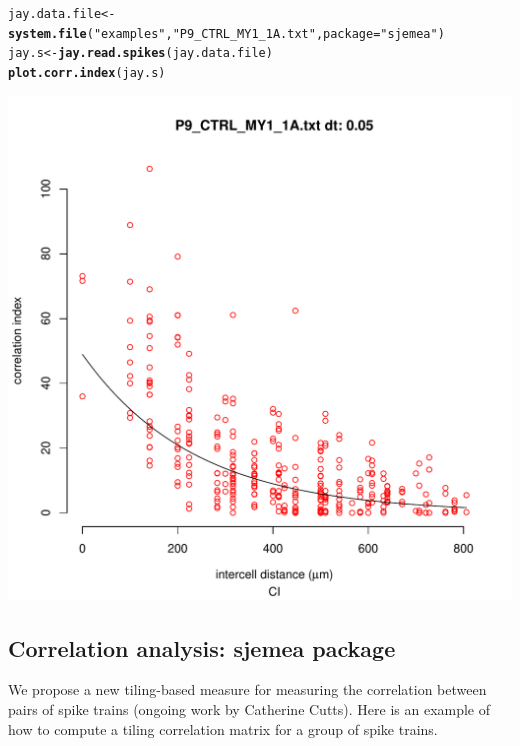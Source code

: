 \documentclass{article}\usepackage[]{graphicx}\usepackage[]{color}
\makeatletter
\def\maxwidth{ %
  \ifdim\Gin@nat@width>\linewidth
    \linewidth
  \else
    \Gin@nat@width
  \fi
}
\newcommand{\hlstr}[1]{\textcolor[rgb]{0.192,0.494,0.8}{#1}}%
\newcommand{\hlstd}[1]{\textcolor[rgb]{0.345,0.345,0.345}{#1}}%
\newcommand{\hlkwb}[1]{\textcolor[rgb]{0.69,0.353,0.396}{#1}}%
\newcommand{\hlkwc}[1]{\textcolor[rgb]{0.333,0.667,0.333}{#1}}%
\newcommand{\hlkwd}[1]{\textcolor[rgb]{0.737,0.353,0.396}{\textbf{#1}}}%
\newenvironment{kframe}{%
 \def\at@end@of@kframe{}%
 \ifinner\ifhmode%
  \def\at@end@of@kframe{\end{minipage}}%
  \begin{minipage}{\columnwidth}%
 \fi\fi%
 \def\FrameCommand##1{\hskip\@totalleftmargin \hskip-\fboxsep
 \colorbox{shadecolor}{##1}\hskip-\fboxsep
     \hskip-\linewidth \hskip-\@totalleftmargin \hskip\columnwidth}%
 \MakeFramed {\advance\hsize-\width
   \@totalleftmargin\z@ \linewidth\hsize
   \@setminipage}}%
 {\par\unskip\endMakeFramed%
 \at@end@of@kframe}
\newenvironment{knitrout}{}{} %
\makeatother
\begin{document}
\begin{knitrout}
\color{fgcolor}\begin{kframe}
\begin{alltt}
\hlstd{jay.data.file} \hlkwb{<-} \hlkwd{system.file}\hlstd{(}\hlstr{"examples"}\hlstd{,} \hlstr{"P9_CTRL_MY1_1A.txt"}\hlstd{,} \hlkwc{package} \hlstd{=} \hlstr{"sjemea"}\hlstd{)}
\hlstd{jay.s} \hlkwb{<-} \hlkwd{jay.read.spikes}\hlstd{(jay.data.file)}
\hlkwd{plot.corr.index}\hlstd{(jay.s)}
\end{alltt}


{\ttfamily\noindent\color{warningcolor}{\#\# Warning: removing 17 zero entries}}\end{kframe}
\includegraphics[width=\maxwidth]{figure/correlation-index} 

\end{knitrout}


\subsection*{Correlation analysis: sjemea package }

We propose a new tiling-based measure for measuring the correlation
between pairs of spike trains (ongoing work by Catherine Cutts).  Here
is an example of how to compute a tiling correlation matrix for a
group of spike trains.
\end{document}
